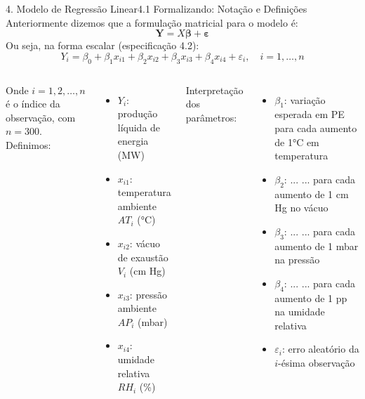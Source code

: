 \documentclass[10pt,aspectratio=169]{beamer}
\begin{document}
\begin{frame}{4. Modelo de Regressão Linear}{4.1 Formalizando: Notação e Definições}
    Anteriormente dizemos que a formulação matricial para o modelo é:
    $$\mathbf{Y} = X\boldsymbol{\beta} + \boldsymbol{\varepsilon}$$
    Ou seja, na forma escalar (especificação 4.2):
    $$Y_i = \beta_0 + \beta_1 x_{i1} + \beta_2 x_{i2} + \beta_3 x_{i3} + \beta_4 x_{i4} + \varepsilon_i, \quad i = 1, \ldots, n$$

\begin{columns}[t]


Onde $i = 1,2,\ldots,n$ é o índice da observação, com $n = 300$.
Definimos:

\begin{itemize}
\item $Y_i$: produção líquida de energia (MW)
\item $x_{i1}$: temperatura ambiente $AT_i$ (°C)
\item $x_{i2}$: vácuo de exaustão $V_i$ (cm Hg)
\item $x_{i3}$: pressão ambiente $AP_i$ (mbar)
\item $x_{i4}$: umidade relativa $RH_i$ (\%)
\end{itemize}


Interpretação dos parâmetros:

\begin{itemize}
\item $\beta_1$: variação esperada em PE para cada aumento de 1°C em temperatura
\item $\beta_2$: ... ...  para cada aumento de 1 cm Hg no vácuo
\item $\beta_3$: ... ... para cada aumento de 1 mbar na pressão
\item $\beta_4$: ... ... para cada aumento de 1 pp na umidade relativa
\item $\varepsilon_i$: erro aleatório da $i$-ésima observação

\end{itemize}
\end{columns}
\end{frame}
\end{document}
